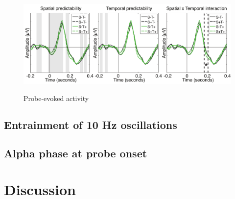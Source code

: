 \documentclass[dwyatte_dissertation.tex]{subfiles}
\begin{document}


\begin{figure}[h!]
\begin{center}
\includegraphics[width=160mm]{figs/pleast/results_probe_tla_All_montage.pdf}
\end{center}
\caption{Probe-evoked activity}{\protect{}}
\label{fig:probe_tla}
\end{figure}

\subsection{Entrainment of 10 Hz oscillations}


\subsection{Alpha phase at probe onset}

\section{Discussion}



\end{document}
